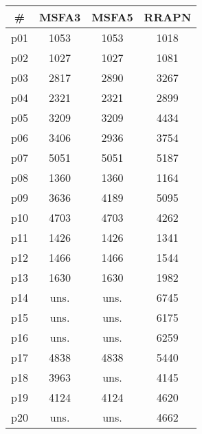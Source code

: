 \begin{tabular}{cccc}
\toprule
\textbf{\#} & \textbf{MSFA3} & \textbf{MSFA5} & \textbf{RRAPN}\\
\midrule
p01 & 1053 & 1053 & 1018\\
p02 & 1027 & 1027 & 1081\\
p03 & 2817 & 2890 & 3267\\
p04 & 2321 & 2321 & 2899\\
p05 & 3209 & 3209 & 4434\\
p06 & 3406 & 2936 & 3754\\
p07 & 5051 & 5051 & 5187\\
p08 & 1360 & 1360 & 1164\\
p09 & 3636 & 4189 & 5095\\
p10 & 4703 & 4703 & 4262\\
p11 & 1426 & 1426 & 1341\\
p12 & 1466 & 1466 & 1544\\
p13 & 1630 & 1630 & 1982\\
p14 & uns. & uns. & 6745\\
p15 & uns. & uns. & 6175\\
p16 & uns. & uns. & 6259\\
p17 & 4838 & 4838 & 5440\\
p18 & 3963 & uns. & 4145\\
p19 & 4124 & 4124 & 4620\\
p20 & uns. & uns. & 4662\\
\bottomrule
\end{tabular}

